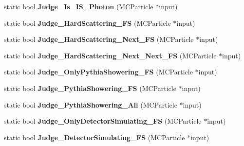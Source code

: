 \begin{DoxyCompactItemize}
\item 
\hypertarget{classToolSet_1_1CMC_a688d2854fa645f4c3adad5013f4c9ba2}{
static bool {\bfseries Judge\_\-Is\_\-IS\_\-Photon} (MCParticle $\ast$input)}
\label{classToolSet_1_1CMC_a688d2854fa645f4c3adad5013f4c9ba2}

\item 
\hypertarget{classToolSet_1_1CMC_a85fbb7bf0ef846c3ae1dcfeb27853911}{
static bool {\bfseries Judge\_\-HardScattering\_\-FS} (MCParticle $\ast$input)}
\label{classToolSet_1_1CMC_a85fbb7bf0ef846c3ae1dcfeb27853911}

\item 
\hypertarget{classToolSet_1_1CMC_af28ed4c00c5b936aa0660253bd4af35b}{
static bool {\bfseries Judge\_\-HardScattering\_\-Next\_\-FS} (MCParticle $\ast$input)}
\label{classToolSet_1_1CMC_af28ed4c00c5b936aa0660253bd4af35b}

\item 
\hypertarget{classToolSet_1_1CMC_a20029373a30ff4642dfbe5ac879ee0ff}{
static bool {\bfseries Judge\_\-HardScattering\_\-Next\_\-Next\_\-FS} (MCParticle $\ast$input)}
\label{classToolSet_1_1CMC_a20029373a30ff4642dfbe5ac879ee0ff}

\item 
\hypertarget{classToolSet_1_1CMC_ae473609376148631113dbf301f800de7}{
static bool {\bfseries Judge\_\-OnlyPythiaShowering\_\-FS} (MCParticle $\ast$input)}
\label{classToolSet_1_1CMC_ae473609376148631113dbf301f800de7}

\item 
\hypertarget{classToolSet_1_1CMC_a47f5a5aff7196a77a729c703ffed1ce7}{
static bool {\bfseries Judge\_\-PythiaShowering\_\-FS} (MCParticle $\ast$input)}
\label{classToolSet_1_1CMC_a47f5a5aff7196a77a729c703ffed1ce7}

\item 
\hypertarget{classToolSet_1_1CMC_a6c340bf257a238e9f68cd251b50599cd}{
static bool {\bfseries Judge\_\-PythiaShowering\_\-All} (MCParticle $\ast$input)}
\label{classToolSet_1_1CMC_a6c340bf257a238e9f68cd251b50599cd}

\item 
\hypertarget{classToolSet_1_1CMC_ab6067e1275a79341e2342906105e16f2}{
static bool {\bfseries Judge\_\-OnlyDetectorSimulating\_\-FS} (MCParticle $\ast$input)}
\label{classToolSet_1_1CMC_ab6067e1275a79341e2342906105e16f2}

\item 
\hypertarget{classToolSet_1_1CMC_afee9479237283cf64d769fb1b1a361ae}{
static bool {\bfseries Judge\_\-DetectorSimulating\_\-FS} (MCParticle $\ast$input)}
\label{classToolSet_1_1CMC_afee9479237283cf64d769fb1b1a361ae}


\end{DoxyCompactItemize}
